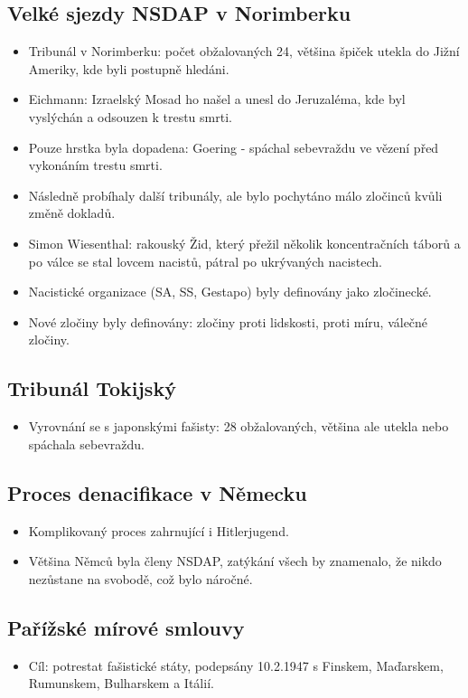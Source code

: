 \documentclass{article}
\begin{document}
\subsection*{Velké sjezdy NSDAP v Norimberku}
\begin{itemize}
    \item Tribunál v Norimberku: počet obžalovaných 24, většina špiček utekla do Jižní Ameriky, kde byli postupně hledáni.
    \item Eichmann: Izraelský Mosad ho našel a unesl do Jeruzaléma, kde byl vyslýchán a odsouzen k trestu smrti.
    \item Pouze hrstka byla dopadena: Goering - spáchal sebevraždu ve vězení před vykonáním trestu smrti.
    \item Následně probíhaly další tribunály, ale bylo pochytáno málo zločinců kvůli změně dokladů.
    \item Simon Wiesenthal: rakouský Žid, který přežil několik koncentračních táborů a po válce se stal lovcem nacistů, pátral po ukrývaných nacistech.
    \item Nacistické organizace (SA, SS, Gestapo) byly definovány jako zločinecké.
    \item Nové zločiny byly definovány: zločiny proti lidskosti, proti míru, válečné zločiny.
\end{itemize}

\subsection*{Tribunál Tokijský}
\begin{itemize}
    \item Vyrovnání se s japonskými fašisty: 28 obžalovaných, většina ale utekla nebo spáchala sebevraždu.
\end{itemize}

\subsection*{Proces denacifikace v Německu}
\begin{itemize}
    \item Komplikovaný proces zahrnující i Hitlerjugend.
    \item Většina Němců byla členy NSDAP, zatýkání všech by znamenalo, že nikdo nezůstane na svobodě, což bylo náročné.
\end{itemize}

\subsection*{Pařížské mírové smlouvy}
\begin{itemize}
    \item Cíl: potrestat fašistické státy, podepsány 10.2.1947 s Finskem, Maďarskem, Rumunskem, Bulharskem a Itálií.
\end{itemize}
\end{document}
